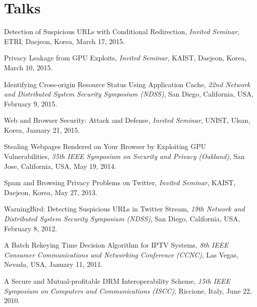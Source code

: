 \documentclass[letterpaper]{article}
\renewenvironment{itemize}{
  \begin{list}{}{
    \setlength{\leftmargin}{1.5em}
  }
}{
  \end{list}
}
\begin{document}
\section*{Talks}
\begin{itemize}
\item Detection of Suspicious URLs with Conditional Redirection, {\it Invited Seminar}, ETRI, Daejeon, Korea, March 17, 2015.
\item Privacy Leakage from GPU Exploits, {\it Invited Seminar}, KAIST, Daejeon, Korea, March 10, 2015.
\item Identifying Cross-origin Resource Status Using Application Cache, {\it 22nd Network and 
    Distributed System Security Symposium (NDSS)}, San Diego, California, USA, February 9, 2015.
\item Web and Browser Security: Attack and Defense, {\it Invited Seminar}, UNIST, Ulsan, Korea, January 21, 2015.
\item Stealing Webpages Rendered on Your Browser by Exploiting GPU Vulnerabilities, {\it 35th IEEE Symposium on Security and Privacy (Oakland)}, San Jose, California, USA, May 19, 2014.
\item Spam and Browsing Privacy Problems on Twitter, {\it Invited Seminar}, KAIST, Daejeon, Korea, May 27, 2013.
\item WarningBird: Detecting Suspicious URLs in Twitter Stream, {\it 19th Network and 
    Distributed System Security Symposium (NDSS)}, San Diego, California, USA, February 8, 2012.
\item A Batch Rekeying Time Decision Algorithm for IPTV Systems, {\it 8th IEEE Consumer
    Communications and Networking Conference (CCNC)}, Las Vegas, Nevada, USA, January 11, 2011.
\item A Secure and Mutual-profitable DRM Interoperability Scheme, {\it 15th IEEE Symposium on
    Computers and Communications (ISCC)}, Riccione, Italy, June 22, 2010.
\end{itemize}
\end{document}
